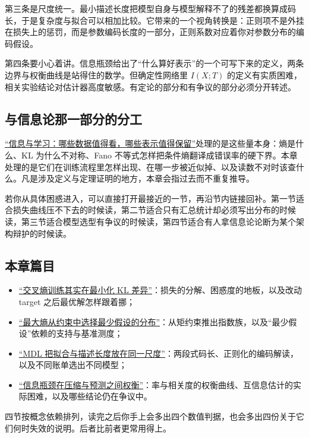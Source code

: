 第三条是尺度统一。最小描述长度把模型自身与模型解释不了的残差都换算成码长，于是复杂度与拟合可以相加比较。它带来的一个视角转换是：正则项不是外挂在损失上的惩罚，而是参数编码长度的一部分，正则系数对应着你对参数分布的编码假设。

第四条要小心着讲。信息瓶颈给出了``什么算好表示''的一个可写下来的定义，两条边界与权衡曲线是站得住的数学。但确定性网络里 \(I(X;T)\) 的定义有实质困难，相关实验结论对估计器高度敏感。有定论的部分和有争议的部分必须分开转述。

\subsection{与信息论那一部分的分工}

\hyperref[ch:059]{``信息与学习：哪些数据值得看，哪些表示值得保留''}处理的是这些量本身：熵是什么、KL 为什么不对称、Fano 不等式怎样把条件熵翻译成错误率的硬下界。本章处理的是它们在训练流程里怎样出现、在哪一步被近似掉、以及读数不对时该查什么。凡是涉及定义与定理证明的地方，本章会指过去而不重复推导。

若你从具体困惑进入，可以直接打开最接近的一节，再沿节内链接回补。第一节适合损失曲线压不下去的时候读，第二节适合只有汇总统计却必须写出分布的时候读，第三节适合模型选型有争议的时候读，第四节适合有人拿信息论论断为某个架构辩护的时候读。

\subsection{本章篇目}

\begin{itemize}
\tightlist
\item \hyperref[sec:13-Machine-Learning/11-Information-Theoretic-Learning/01]{``交叉熵训练其实在最小化 KL 差异''}：损失的分解、困惑度的地板，以及改动 target 之后最优解怎样跟着挪；
\item \hyperref[sec:13-Machine-Learning/11-Information-Theoretic-Learning/02]{``最大熵从约束中选择最少假设的分布''}：从矩约束推出指数族，以及``最少假设''依赖的支持与基准测度；
\item \hyperref[sec:13-Machine-Learning/11-Information-Theoretic-Learning/03]{``MDL 把拟合与描述长度放在同一尺度''}：两段式码长、正则化的编码解读，以及不同账单选出不同模型；
\item \hyperref[sec:13-Machine-Learning/11-Information-Theoretic-Learning/04]{``信息瓶颈在压缩与预测之间权衡''}：率与相关度的权衡曲线、互信息估计的实际困难，以及哪些结论仍在争议中。
\end{itemize}

四节按概念依赖排列，读完之后你手上会多出四个数值判据，也会多出四份关于它们何时失效的说明。后者比前者更常用得上。
